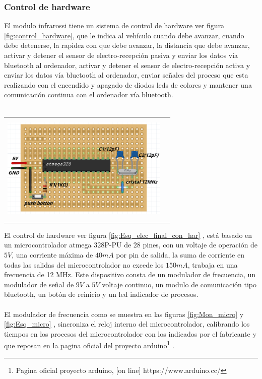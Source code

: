 \documentclass[12]{article}
\newenvironment{Figure}
{\par\medskip\noindent\minipage{\linewidth}}
{\endminipage\par\medskip}
\begin{document}
\begin{multicols}{2}
\subsubsection{Control de hardware}
El modulo infrarossi tiene un sistema de control de hardware ver figura \ref{fig:control_hardware}, que le indica al vehículo cuando debe avanzar, cuando debe detenerse, la rapidez con que debe avanzar, la distancia que debe avanzar, activar y detener el sensor de electro-recepción pasiva y enviar los datos vía bluetooth al ordenador, activar y detener el sensor de electro-recepción activa y enviar los datos vía bluetooth al ordenador, enviar señales del proceso que esta realizando con el encendido y apagado de diodos leds de colores y mantener una comunicación continua con el ordenador vía bluetooth.   \\ \\
\begin{Figure}
\center
\begin{tabular}{|l|r|}
\hline
\\
\includegraphics[width=8cm, height=5cm]{img/F1.png}  \\\\ \hline
\end{tabular}
\label{fig:Mon_micro}
\end{Figure}
El control de hardware ver figura \ref{fig:Esq_elec_final_con_har} , está basado en un microcontrolador atmega\cite{ARDUINO} 328P-PU de 28 pines, con un voltaje de operación de $5 V$, una corriente máxima de  $40 mA$ por pin de salida, la suma de corriente en todas las salidas del microcontrolador no excede los  $150 mA$, trabaja en una frecuencia de 12 MHz. Este dispositivo consta de un modulador de frecuencia, un modulador de señal de $9V$ a $5V$ voltaje continuo, un modulo de comunicación tipo bluetooth, un botón de reinicio y un led indicador de procesos. \\ \\
El modulador de frecuencia como se muestra en las figuras \ref{fig:Mon_micro} y \ref{fig:Esq_micro} , sincroniza el reloj interno del microcontrolador, calibrando los tiempos en los procesos del microcontrolador con los indicados por el fabricante y que reposan en la pagina oficial del proyecto arduino\footnote{Pagina oficial proyecto arduino, [on line] https://www.arduino.cc/} .


\end{multicols}
\end{document}
